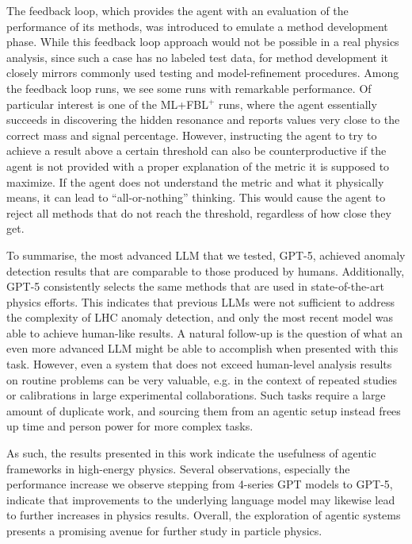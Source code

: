 \documentclass[submission, Phys]{SciPost}
\begin{document}
The feedback loop, which provides the agent with an evaluation of the performance of its methods, was introduced to emulate a method development phase. While this feedback loop approach would not be possible in a real physics analysis, since such a case has no labeled test data, for method development it closely mirrors commonly used testing and model-refinement procedures. Among the feedback loop runs, we see some runs with remarkable performance. Of particular interest is one of the ML+FBL$^+$ runs, where the agent essentially succeeds in discovering the hidden resonance and reports values very close to the correct mass and signal percentage. However, instructing the agent to try to achieve a result above a certain threshold can also be counterproductive if the agent is not provided with a proper explanation of the metric it is supposed to maximize. If the agent does not understand the metric and what it physically means, it can lead to ``all-or-nothing'' thinking. This would cause the agent to reject all methods that do not reach the threshold, regardless of how close they get.  

To summarise, the most advanced LLM that we tested, GPT-5, achieved anomaly detection results that are comparable to those produced by humans. 
Additionally, GPT-5 consistently selects the same methods that are used in state-of-the-art physics efforts.
This indicates that previous LLMs were not sufficient to address the complexity of LHC anomaly detection, and only the most recent model was able to achieve human-like results.
A natural follow-up is the question of what an even more advanced LLM might be able to accomplish when presented with this task.
However, even a system that does not exceed human-level analysis results on routine problems can be very valuable, e.g. in the context of repeated studies or calibrations in large experimental collaborations.
Such tasks require a large amount of duplicate work, and sourcing them from an agentic setup instead frees up time and person power for more complex tasks. 

As such, the results presented in this work indicate the usefulness of agentic frameworks in high-energy physics. 
Several observations, especially the performance increase we observe stepping from 4-series GPT models to GPT-5, indicate that improvements to the underlying language model may likewise lead to further increases in physics results. Overall, the exploration of agentic systems presents a promising avenue for further study in particle physics.
\end{document}

